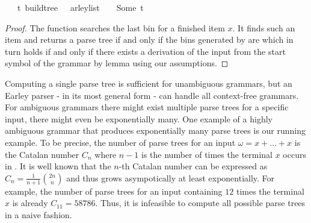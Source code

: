 \begin{isabellebody}
\ \ \ {\isachardoublequoteopen}{\isacharparenleft}{\kern0pt}{\isasymexists}t{\isachardot}{\kern0pt}\ build{\isacharunderscore}{\kern0pt}tree\ {\isasymG}\ {\isasymomega}\ {\isacharparenleft}{\kern0pt}{\isasymE}arley{\isacharunderscore}{\kern0pt}list\ {\isasymG}\ {\isasymomega}{\isacharparenright}{\kern0pt}\ {\isacharequal}{\kern0pt}\ Some\ t{\isacharparenright}{\kern0pt}\ {\isasymlongleftrightarrow}\ {\isasymG}\ {\isasymturnstile}\ {\isacharbrackleft}{\kern0pt}{\isasymSS}\ {\isasymG}{\isacharbrackright}{\kern0pt}\ {\isasymRightarrow}\isactrlsup {\isacharasterisk}{\kern0pt}\ {\isasymomega}{\isachardoublequoteclose}%
\isadelimproof
%
\endisadelimproof
%
\isatagproof
%
\endisatagproof
{\isafoldproof}%
%
\isadelimproof
%
\endisadelimproof
%
\begin{isamarkuptext}%
\begin{proof}

The function  searches the last bin for a finished item $x$.
It finds such an item and returns a parse tree if and only if the bins generated
by  are  which in turn holds if and only if
there exists a derivation of the input from the start symbol of the grammar by
lemma  using our assumptions.

\end{proof}%
\end{isamarkuptext}\isamarkuptrue%
%
\isadelimdocument
%
\endisadelimdocument
%
\isatagdocument
%
\isamarkuptrue%
%
\endisatagdocument
{\isafolddocument}%
%
\isadelimdocument
%
\endisadelimdocument
%
\begin{isamarkuptext}%
Computing a single parse tree is sufficient for unambiguous grammars, but an Earley parser - in its most general form -
can handle all context-free grammars. For ambiguous grammars there might exist multiple
parse trees for a specific input, there might even be exponentially many. One example of a highly ambiguous
grammar that produces exponentially many parse trees is our running example. To be precise, the number of
parse trees for an input $\omega = x + \dots + x$ is the Catalan number $C_n$ where $n-1$ is the
number of times the terminal $x$ occurs in \isa{{\isasymomega}}. It is well known that the $n$-th Catalan number can be expressed as
$C_n = \frac{1}{n+1} \binom{2n}{n}$ and thus grows asympotically at least exponentially. For example, the number of parse trees for an input \isa{{\isasymomega}} containing
$12$ times the terminal $x$ is already $C_{11} = 58786$. Thus, it is infeasible to compute all possible
parse trees in a naive fashion.


\end{isamarkuptext}
\end{isabellebody}

